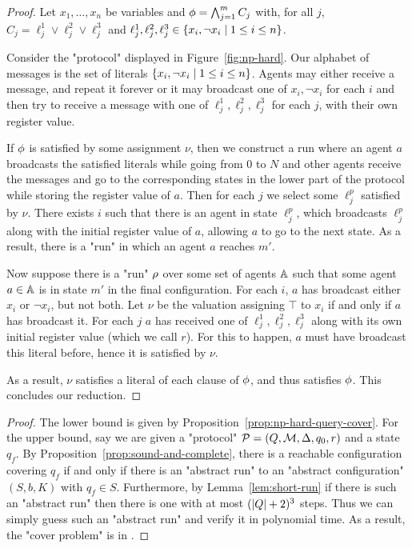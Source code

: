 \begin{proof}
	Let $x_1, \ldots, x_n$ be variables and $\phi = \bigwedge_{j=1}^m C_j$ with, for all $j$, $C_j = \ell_j^1 \lor \ell_j^2 \lor \ell_j^3$ and $\ell_j^1, \ell_j^2, \ell_j^3 \in \{x_i, \neg x_i \mid 1 \leq i \leq n\}$. 
	
	Consider the "protocol" displayed in Figure~\ref{fig:np-hard}.
	Our alphabet of messages is the set of literals $\{x_i, \neg x_i \mid 1 \leq i \leq n\}$.
	Agents may either receive a message, and repeat it forever or it may broadcast one of $x_i, \neg x_i$ for each $i$ and then try to receive a message with one of $\ell_j^1, \ell_j^2, \ell_j^3$ for each $j$, with their own register value.
	
	If $\phi$ is satisfied by some assignment $\nu$, then we construct a run where an agent $a$ broadcasts the satisfied literals while going from $0$ to $N$ and other agents receive the messages and go to the corresponding states in the lower part of the protocol while storing the register value of $a$.
	Then for each $j$ we select some $\ell_j^p$ satisfied by $\nu$. There exists $i$ such that there is an agent in state $\ell_j^p$, which broadcasts $\ell_j^p$ along with the initial register value of $a$, allowing $a$ to go to the next state.
	As a result, there is a "run" in which an agent $a$ reaches $m'$.
	
	Now suppose there is a "run" $\rho$ over some set of agents $\mathbb{A}$ such that some agent $a \in \mathbb{A}$ is in state $m'$ in the final configuration.
	For each $i$, $a$ has broadcast either $x_i$ or $\neg x_i$, but not both.
	Let $\nu$ be the valuation assigning $\top$ to $x_i$ if and only if $a$ has broadcast it.
	For each $j$ $a$ has received one of $\ell_j^1, \ell_j^2, \ell_j^3$ along with its own initial register value (which we call $r$). For this to happen, $a$ must have broadcast this literal before, hence it is satisfied by $\nu$.
	
	As a result, $\nu$ satisfies a literal of each clause of $\phi$, and thus satisfies $\phi$. This concludes our reduction.
\end{proof}



\thmNPComplete*

\begin{proof}
	The lower bound is given by Proposition~\ref{prop:np-hard-query-cover}.
	For the upper bound, say we are given a "protocol" $\mathcal{P} = (Q, \mathcal{M}, \Delta, q_0, r)$ and a state $q_f$. By Proposition~\ref{prop:sound-and-complete}, there is a reachable configuration covering $q_f$ if and only if there is an "abstract run" to an "abstract configuration" $(S,b, K)$ with $q_f \in S$.
	Furthermore, by Lemma~\ref{lem:short-run} if there is such an "abstract run" then there is one with at most $(|Q|+2)^3$ steps. 
	Thus we can simply guess such an "abstract run" and verify it in polynomial time.
	As a result, the "cover problem" is in \NP. 
\end{proof}